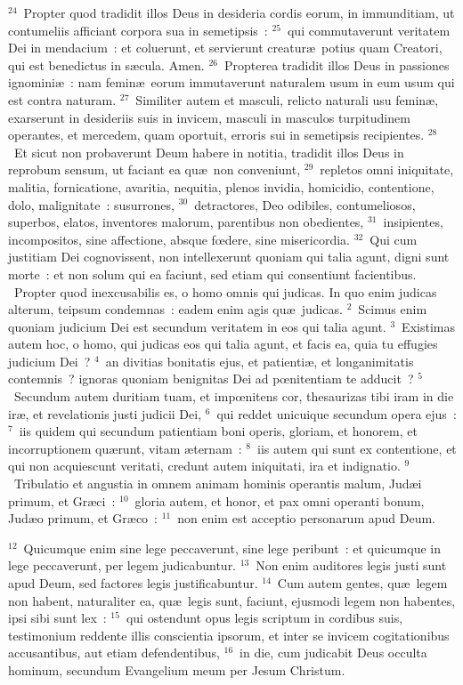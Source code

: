${}^{24}$~Propter quod tradidit illos Deus in desideria cordis eorum, in immunditiam, ut contumeliis afficiant corpora sua in semetipsis~:
${}^{25}$~qui commutaverunt veritatem Dei in mendacium~: et coluerunt, et servierunt creatur\ae\ potius quam Creatori, qui est benedictus in s\ae cula. Amen.
${}^{26}$~Propterea tradidit illos Deus in passiones ignomini\ae~: nam femin\ae\ eorum immutaverunt naturalem usum in eum usum qui est contra naturam.
${}^{27}$~Similiter autem et masculi, relicto naturali usu femin\ae , exarserunt in desideriis suis in invicem, masculi in masculos turpitudinem operantes, et mercedem, quam oportuit, erroris sui in semetipsis recipientes.
${}^{28}$~Et sicut non probaverunt Deum habere in notitia, tradidit illos Deus in reprobum sensum, ut faciant ea qu\ae\ non conveniunt,
${}^{29}$~repletos omni iniquitate, malitia, fornicatione, avaritia, nequitia, plenos invidia, homicidio, contentione, dolo, malignitate~: susurrones,
${}^{30}$~detractores, Deo odibiles, contumeliosos, superbos, elatos, inventores malorum, parentibus non obedientes,
${}^{31}$~insipientes, incompositos, sine affectione, absque fœdere, sine misericordia.
${}^{32}$~Qui cum justitiam Dei cognovissent, non intellexerunt quoniam qui talia agunt, digni sunt morte~: et non solum qui ea faciunt, sed etiam qui consentiunt facientibus.
~Propter quod inexcusabilis es, o homo omnis qui judicas. In quo enim judicas alterum, teipsum condemnas~: eadem enim agis qu\ae\ judicas.
${}^{2}$~Scimus enim quoniam judicium Dei est secundum veritatem in eos qui talia agunt.
${}^{3}$~Existimas autem hoc, o homo, qui judicas eos qui talia agunt, et facis ea, quia tu effugies judicium Dei~?
${}^{4}$~an divitias bonitatis ejus, et patienti\ae , et longanimitatis contemnis~? ignoras quoniam benignitas Dei ad pœnitentiam te adducit~?
${}^{5}$~Secundum autem duritiam tuam, et impœnitens cor, thesaurizas tibi iram in die ir\ae , et revelationis justi judicii Dei,
${}^{6}$~qui reddet unicuique secundum opera ejus~:
${}^{7}$~iis quidem qui secundum patientiam boni operis, gloriam, et honorem, et incorruptionem qu\ae runt, vitam \ae ternam~:
${}^{8}$~iis autem qui sunt ex contentione, et qui non acquiescunt veritati, credunt autem iniquitati, ira et indignatio.
${}^{9}$~Tribulatio et angustia in omnem animam hominis operantis malum, Jud\ae i primum, et Gr\ae ci~:
${}^{10}$~gloria autem, et honor, et pax omni operanti bonum, Jud\ae o primum, et Gr\ae co~:
${}^{11}$~non enim est acceptio personarum apud Deum.


${}^{12}$~Quicumque enim sine lege peccaverunt, sine lege peribunt~: et quicumque in lege peccaverunt, per legem judicabuntur.
${}^{13}$~Non enim auditores legis justi sunt apud Deum, sed factores legis justificabuntur.
${}^{14}$~Cum autem gentes, qu\ae\ legem non habent, naturaliter ea, qu\ae\ legis sunt, faciunt, ejusmodi legem non habentes, ipsi sibi sunt lex~:
${}^{15}$~qui ostendunt opus legis scriptum in cordibus suis, testimonium reddente illis conscientia ipsorum, et inter se invicem cogitationibus accusantibus, aut etiam defendentibus,
${}^{16}$~in die, cum judicabit Deus occulta hominum, secundum Evangelium meum per Jesum Christum.



